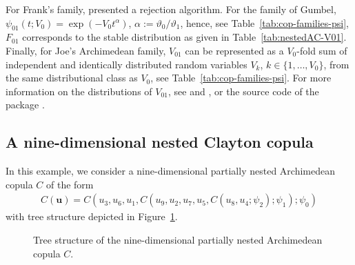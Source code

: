 \documentclass[nojss,article]{jss}
\theoremstyle{mythmstyle}
\newcommand*{\vt}{\vartheta}
\newcommand*{\setcapwidth}[1]{}
\newcommand*{\textcite}[2][]{\citet[#1]{#2}}
\begin{document}
For Frank's family, \textcite{hofert2010a} presented a rejection algorithm.
For the family of Gumbel, $\psi_{01}(t;V_0)=\exp(-V_0t^\alpha)$,
$\alpha:=\vt_0/\vt_1$, hence, see Table~\ref{tab:cop-families-psi}, $F_{01}$ corresponds
to the stable distribution as given in Table~\ref{tab:nestedAC-V01}. Finally, for
Joe's Archimedean family, $V_{01}$ can be represented as a $V_0$-fold sum of
independent and identically distributed random variables $V_k$,
$k\in\{1,\dots,V_0\}$, from the same distributional class as $V_0$, see
Table~\ref{tab:cop-families-psi}. For more information on the distributions of $V_{01}$,
see \textcite{hofert2010a} and \textcite{hofert2010c}, or the source code of
the package .

\subsection{A nine-dimensional nested Clayton copula}
In this example, we consider a nine-dimensional partially nested Archimedean
copula $C$ of the form
\begin{align*}
 C(\bm{u})=C(u_3,u_6,u_1,C(u_9,u_2,u_7,u_5,C(u_8,u_4;\psi_2);\psi_1);\psi_0)
\end{align*}
with tree structure depicted in Figure~\ref{figure2}.
\begin{figure}[htbp]
 \centering
\setcapwidth{\textwidth}%
\caption{Tree structure of the nine-dimensional partially nested Archimedean
copula $C$.}
\label{figure2}
\end{figure}
\end{document}
